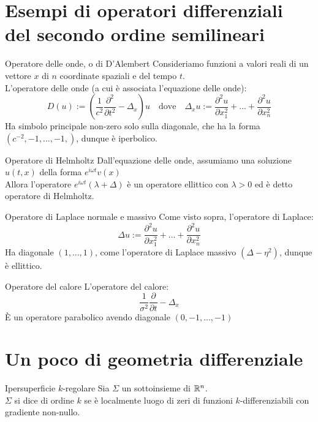 \documentclass{book}
\begin{document}
\section{Esempi di operatori differenziali del secondo ordine semilineari}

\begin{example}{Operatore delle onde, o di D'Alembert}{}
    Consideriamo funzioni a valori reali di un vettore $x$ di $n$ coordinate spaziali e del tempo $t$.\\
    L'operatore delle onde (a cui è associata l'equazione delle onde):
    \[ D(u) := \left(\frac{1}{c^2}\frac{\partial^2}{\partial t^2} - \Delta_x\right) u \quad \text{dove}\quad \Delta_x u := \frac{\partial^2 u}{\partial x_1^2} +...+ \frac{\partial^2 u}{\partial x_n^2}\]
    Ha simbolo principale non-zero solo sulla diagonale, che ha la forma $(c^{-2},-1,...,-1,)$, dunque è iperbolico.
\end{example}

\begin{example}{Operatore di Helmholtz}{}
    Dall'equazione delle onde, assumiamo una soluzione $u(t,x)$ della forma $e^{i\omega t}v(x)$\\
    Allora l'operatore $e^{i\omega t}(\lambda + \Delta)$ è un operatore ellittico con $\lambda>0$ ed è detto operatore di Helmholtz.
\end{example}

\begin{example}{Operatore di Laplace normale e massivo}{}
    Come visto sopra, l'operatore di Laplace:
    \[\Delta u := \frac{\partial^2 u}{\partial x_1^2} +...+ \frac{\partial^2 u}{\partial x_n^2}\]
    Ha diagonale $(1,...,1)$, come l'operatore di Laplace massivo $(\Delta - \eta^2)$, dunque è ellittico.
\end{example}

\begin{example}{Operatore del calore}{}
    L'operatore del calore:
    \[\frac{1}{\sigma^2} \frac{\partial}{\partial t} - \Delta_x\]
    È un operatore parabolico avendo diagonale $(0,-1,...,-1)$
\end{example}

\section{Un poco di geometria differenziale}

\begin{definition}{Ipersuperficie $k$-regolare}{}
    Sia $\Sigma$ un sottoinsieme di $\mathbb{R}^n$.\\
    $\Sigma$ si dice  di ordine $k$ se è localmente luogo di zeri di funzioni $k$-differenziabili con gradiente non-nullo.
\end{definition}
\end{document}
